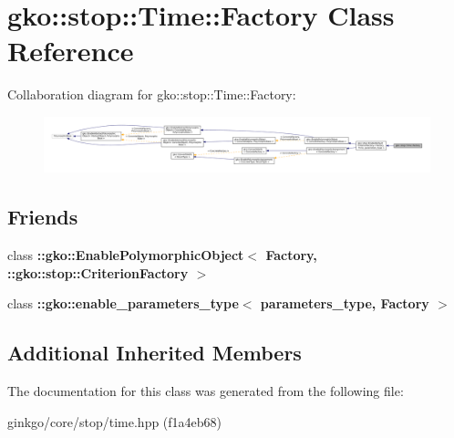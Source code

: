 \hypertarget{classgko_1_1stop_1_1Time_1_1Factory}{}\section{gko\+:\+:stop\+:\+:Time\+:\+:Factory Class Reference}
\label{classgko_1_1stop_1_1Time_1_1Factory}


Collaboration diagram for gko\+:\+:stop\+:\+:Time\+:\+:Factory\+:
\nopagebreak
\begin{figure}[H]
\begin{center}
\leavevmode
\includegraphics[width=350pt]{classgko_1_1stop_1_1Time_1_1Factory__coll__graph}
\end{center}
\end{figure}
\subsection*{Friends}
\begin{DoxyCompactItemize}
\item 
\mbox{\label{classgko_1_1stop_1_1Time_1_1Factory_aaa5507cf00e5361a77971746fefa42e6}} 
class {\bfseries \+::gko\+::\+Enable\+Polymorphic\+Object$<$ Factory, \+::gko\+::stop\+::\+Criterion\+Factory $>$}
\item 
\mbox{\label{classgko_1_1stop_1_1Time_1_1Factory_a0d176cbd42d6214e11aee8c30ca256fc}} 
class {\bfseries \+::gko\+::enable\+\_\+parameters\+\_\+type$<$ parameters\+\_\+type, Factory $>$}
\end{DoxyCompactItemize}
\subsection*{Additional Inherited Members}


The documentation for this class was generated from the following file\+:\begin{DoxyCompactItemize}
\item 
ginkgo/core/stop/time.\+hpp (f1a4eb68)\end{DoxyCompactItemize}
